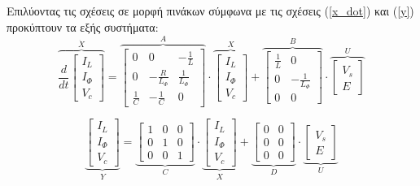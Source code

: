 \noindent
Επιλύοντας τις σχέσεις σε μορφή πινάκων σύμφωνα με τις σχέσεις (\ref{x_dot}) και (\ref{y}) προκύπτουν τα εξής συστήματα:
\begin{equation*}
	\overbrace{
		\frac{d}{dt} 
		\begin{bmatrix}
			I_L\\
			I_{\Phi}\\
			V_c
		\end{bmatrix}
	}^{\dot{X}}
	=
	\overbrace{
		\begin{bmatrix}
			0 		& 					0 			 & -\frac{1}{L}\\
			0       & -\frac{R}{L_{\Phi}} & \frac{1}{L_{\Phi}}\\
			\frac{1}{C}  & 		   -\frac{1}{C}      & 				0
		\end{bmatrix}
	}^A
	\cdot
	\overbrace{
		\begin{bmatrix}
			I_L\\
			I_{\Phi}\\
			V_c
		\end{bmatrix}
	}^X
	+ 	
	\overbrace{
		\begin{bmatrix}
			\frac{1}{L}  &	    			0 			\\
			0           &  -\frac{1}{L_{\Phi}}\\
			0		    & 		  			0
		\end{bmatrix}
	}^B
	\cdot
	\overbrace{
		\begin{bmatrix}
			V_s\\
			E		
		\end{bmatrix}
	}^U
\end{equation*} 

\begin{equation*}
	\underbrace{
		\begin{bmatrix}
			I_L\\
			I_{\Phi}\\
			V_c
		\end{bmatrix}
	}_Y
	=
	\underbrace{
		\begin{bmatrix}
			1 & 0 & 0\\
			0 & 1 & 0\\
			0 & 0 & 1
		\end{bmatrix}
	}_C
	\cdot
	\underbrace{
		\begin{bmatrix}
			I_L\\
			I_{\Phi}\\
			V_c
		\end{bmatrix}
	}_X
	+ 
	\underbrace{	
		\begin{bmatrix}
			0 & 0 \\
			0 & 0 \\
			0 & 0
		\end{bmatrix}
	}_D
	\cdot
	\underbrace{
		\begin{bmatrix}
			V_s\\
			E		
		\end{bmatrix}
	}_U
\end{equation*}


